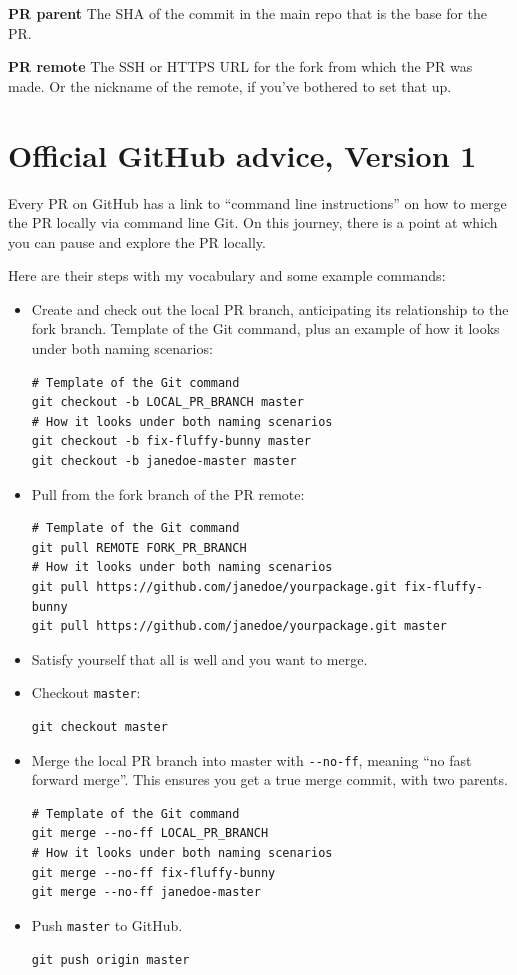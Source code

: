 \documentclass[
]{book}
\begin{document}
\textbf{PR parent} The SHA of the commit in the main repo that is the base for the PR.

\textbf{PR remote} The SSH or HTTPS URL for the fork from which the PR was made. Or the nickname of the remote, if you've bothered to set that up.

\section{Official GitHub advice, Version 1}\label{official-github-advice-version-1}

Every PR on GitHub has a link to ``command line instructions'' on how to merge the PR locally via command line Git. On this journey, there is a point at which you can pause and explore the PR locally.

Here are their steps with my vocabulary and some example commands:

\begin{itemize}
\item
  Create and check out the local PR branch, anticipating its relationship to the fork branch. Template of the Git command, plus an example of how it looks under both naming scenarios:

\begin{verbatim}
# Template of the Git command
git checkout -b LOCAL_PR_BRANCH master 
# How it looks under both naming scenarios
git checkout -b fix-fluffy-bunny master 
git checkout -b janedoe-master master 
\end{verbatim}
\item
  Pull from the fork branch of the PR remote:

\begin{verbatim}
# Template of the Git command
git pull REMOTE FORK_PR_BRANCH
# How it looks under both naming scenarios
git pull https://github.com/janedoe/yourpackage.git fix-fluffy-bunny
git pull https://github.com/janedoe/yourpackage.git master
\end{verbatim}
\item
  Satisfy yourself that all is well and you want to merge.
\item
  Checkout \texttt{master}:

\begin{verbatim}
git checkout master
\end{verbatim}
\item
  Merge the local PR branch into master with \texttt{-\/-no-ff}, meaning ``no fast forward merge''. This ensures you get a true merge commit, with two parents.

\begin{verbatim}
# Template of the Git command
git merge --no-ff LOCAL_PR_BRANCH
# How it looks under both naming scenarios
git merge --no-ff fix-fluffy-bunny
git merge --no-ff janedoe-master
\end{verbatim}
\item
  Push \texttt{master} to GitHub.

\begin{verbatim}
git push origin master
\end{verbatim}
\end{itemize}
\end{document}
